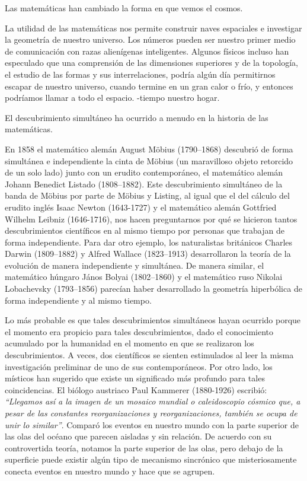 \documentclass{article}
\begin{document}
Las matem\'aticas han cambiado la forma en que vemos el cosmos.

La utilidad de las matem\'aticas nos permite construir naves espaciales e
investigar la geometr\'ia de nuestro universo. Los n\'umeros pueden ser nuestro
primer medio de comunicaci\'on con razas alien\'igenas inteligentes. Algunos f\'isicos
incluso han especulado que una comprensi\'on de las dimensiones superiores y de la
topolog\'ia, el estudio de las formas y sus interrelaciones, podr\'ia alg\'un d\'ia
permitirnos escapar de nuestro universo, cuando termine en un gran calor o fr\'io,
y entonces podr\'iamos llamar a todo el espacio. -tiempo nuestro hogar.

El descubrimiento simult\'aneo ha ocurrido a menudo en la historia de las
matem\'aticas.

En 1858 el matem\'atico alem\'an August Möbius (1790–1868) descubri\'o de forma
simult\'anea e independiente la cinta de Möbius (un maravilloso objeto retorcido
de un solo lado) junto con un erudito contempor\'aneo, el matem\'atico alem\'an
Johann Benedict Listado (1808–1882). Este descubrimiento simult\'aneo de la
banda de Möbius por parte de Möbius y Listing, al igual que el del c\'alculo del
erudito ingl\'es Isaac Newton (1643-1727) y el matem\'atico alem\'an Gottfried
Wilhelm Leibniz (1646-1716), nos hacen preguntarnos por qu\'e se hicieron tantos
descubrimientos cient\'ificos en al mismo tiempo por personas que trabajan de
forma independiente. Para dar otro ejemplo, los naturalistas brit\'anicos
Charles Darwin (1809–1882) y Alfred Wallace (1823–1913) desarrollaron la
teor\'ia de la evoluci\'on de manera independiente y simult\'anea. De manera
similar, el matem\'atico h\'ungaro J\'anos Bolyai (1802–1860) y el matem\'atico
ruso Nikolai Lobachevsky (1793–1856) parec\'ian haber desarrollado la
geometr\'ia hiperb\'olica de forma independiente y al mismo tiempo.

Lo m\'as probable es que tales descubrimientos simult\'aneos hayan ocurrido porque
el momento era propicio para tales descubrimientos, dado el conocimiento
acumulado por la humanidad en el momento en que se realizaron los
descubrimientos. A veces, dos cient\'ificos se sienten estimulados al leer la
misma investigaci\'on preliminar de uno de sus contempor\'aneos. Por otro lado, los
m\'isticos han sugerido que existe un significado m\'as profundo para tales
coincidencias. El bi\'ologo austriaco Paul Kammerer (1880-1926) escribi\'o:
\textit{“Llegamos as\'i a la imagen de un mosaico mundial o caleidoscopio c\'osmico que, a
pesar de las constantes reorganizaciones y reorganizaciones, tambi\'en se ocupa de
unir lo similar”}. Compar\'o los eventos en nuestro mundo con la parte superior de
las olas del oc\'eano que parecen aisladas y sin relaci\'on. De acuerdo con su
controvertida teor\'ia, notamos la parte superior de las olas, pero debajo de la
superficie puede existir alg\'un tipo de mecanismo sincr\'onico que misteriosamente
conecta eventos en nuestro mundo y hace que se agrupen.
\end{document}
